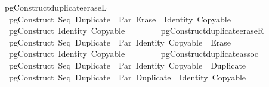 \isamarkupfalse%
\isanewline
\ \ \ pgConstruct{\isacharunderscore}duplicate{\isacharunderscore}eraseL{\isacharcolon}\isanewline
\ \ \ \ pgConstruct\ {\isacharparenleft}Seq\ {\isacharparenleft}Duplicate\ \ {\isacharparenleft}Par\ {\isacharparenleft}Erase\ \ {\isacharparenleft}Identity\ {\isacharparenleft}Copyable\ \ {\isacharequal}\isanewline
\ \ \ \ pgConstruct\ {\isacharparenleft}Identity\ {\isacharparenleft}Copyable\ \isanewline
\ \ \ \ \ \ \ pgConstruct{\isacharunderscore}duplicate{\isacharunderscore}eraseR{\isacharcolon}\isanewline
\ \ \ \ pgConstruct\ {\isacharparenleft}Seq\ {\isacharparenleft}Duplicate\ \ {\isacharparenleft}Par\ {\isacharparenleft}Identity\ {\isacharparenleft}Copyable\ \ {\isacharparenleft}Erase\ \ {\isacharequal}\isanewline
\ \ \ \ pgConstruct\ {\isacharparenleft}Identity\ {\isacharparenleft}Copyable\ \isanewline
\ \ \ \ \ \ \ pgConstruct{\isacharunderscore}duplicate{\isacharunderscore}assoc{\isacharcolon}\isanewline
\ \ \ \ pgConstruct\ {\isacharparenleft}Seq\ {\isacharparenleft}Duplicate\ \ {\isacharparenleft}Par\ {\isacharparenleft}Identity\ {\isacharparenleft}Copyable\ \ {\isacharparenleft}Duplicate\ \ {\isacharequal}\isanewline
\ \ \ \ pgConstruct\ {\isacharparenleft}Seq\ {\isacharparenleft}Duplicate\ \ {\isacharparenleft}Par\ {\isacharparenleft}Duplicate\ \ {\isacharparenleft}Identity\ {\isacharparenleft}Copyable\ 
